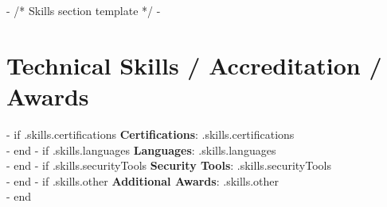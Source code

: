 {{- /* Skills section template */ -}}
\section{Technical Skills / Accreditation / Awards}
 \begin{itemize}[leftmargin=0.15in, label={}]
    \small{\item{
{{- if .skills.certifications}}
    \textbf{Certifications}{: {{.skills.certifications}}} \\
{{- end}}
{{- if .skills.languages}}
     \textbf{Languages}{: {{.skills.languages}}} \\
{{- end}}
{{- if .skills.securityTools}}
     \textbf{Security Tools}{: {{.skills.securityTools}}} \\
{{- end}}
{{- if .skills.other}}
     \textbf{Additional Awards}{: {{.skills.other}}} \\
{{- end}}
    }}
 \end{itemize}
